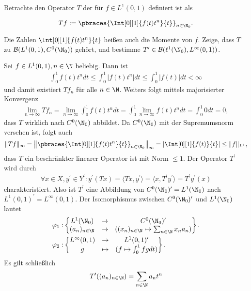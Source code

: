 \begin{exercise}[18/1]

Betrachte den Operator $T$ der für $f \in L^1(0, 1)$ definiert ist als

\begin{align*}
  T f
  :=
  \pbraces{\Int[0][1]{f(t) t^n}{t}}_{n \in \N_0}.
\end{align*}

Die Zahlen $\Int[0][1]{f(t) t^n}{t}$ heißen auch die Momente von $f$.
Zeige, dass $T$ zu $\mathcal{B}(L^1(0, 1), C^0(\N_0))$ gehört, und bestimme $T^\prime \in \mathcal{B}(\ell^1(\N_0), L^\infty(0, 1))$.

\end{exercise}

\begin{solution}
Sei $f \in L^1(0,1), n \in \N$ beliebig. Dann ist
\begin{align*}
  \int_0^1 f(t)t^n dt \leq   \int_0^1|f(t)t^n|dt \leq \int_0^1 |f(t)| dt < \infty
\end{align*}
und damit existiert $Tf_n$ für alle $n \in \N$. Weiters folgt mittels majorisierter
Konvergenz
\begin{align*}
  \lim_{n \to \infty} Tf_n = \lim_{n \to \infty} \int_0^1 f(t)t^n dt
  =  \int_0^1 \lim_{n \to \infty}f(t)t^n dt = \int_0^1 0 dt= 0,
\end{align*}
dass $T$ wirklich nach $C^0(\N_0)$ abbildet. Da $C^0(\N_0)$ mit der Supremumsnorm
versehen ist, folgt auch
\begin{align*}
  \|Tf\|_{\infty} = \left\|\pbraces{\Int[0][1]{f(t) t^n}{t}}_{n \in \N_0}\right\|_{\infty} =
  \left|\Int[0][1]{f(t)}{t}\right| \leq \|f\|_{L^1},
\end{align*}
dass $T$ ein beschränkter linearer Operator ist mit Norm $\leq 1$.
Der Operator $T^{\prime}$ wird durch
\begin{align*}
  \forall x \in X, y^{\prime} \in Y^{\prime}:
  y^{\prime}(Tx) = \langle Tx,y^{\prime} \rangle =
  \langle x, T^{\prime}y^{\prime}\rangle = T^{\prime}y^{\prime}(x)
\end{align*}
charakteristiert. Also ist $T^{\prime}$ eine Abbildung von $C^0(\N_0)^{\prime} = L^1(\N_0)$
nach $L^1(0, 1)^{\prime} = L^\infty(0, 1)$.
Der Isomorphismus zwischen $C^0(\N_0)^{\prime}$ und $L^1(\N_0)$ lautet
\begin{align*}
  \varphi_1:& \begin{Bmatrix}
    L^1(\N_0) & \to & C^0(\N_0)^{\prime} \\
    (a_n)_{n \in \N} &\mapsto & ((x_n)_{n \in \N} \mapsto \sum_{n \in \N}x_na_n)
  \end{Bmatrix}. \\
  \varphi_2:& \begin{Bmatrix}
    L^\infty(0, 1) & \to & L^1(0, 1)^{\prime} \\
    g &\mapsto & (f \mapsto \int_0^1 fg dt)
  \end{Bmatrix}.
\end{align*}
Es gilt schließlich
\begin{align*}
  T^{\prime}((a_n)_{n \in\N}) = \sum_{n \in \N}a_n t^n
\end{align*}
\end{solution}
